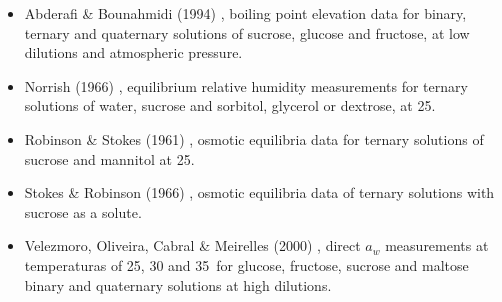 \documentclass[
	12pt,				%
	openright,
	twoside,
	a4paper,			%
	brazil,			%
	french,				%
	english				%
	]{abntex2}
\begin{document}
\begin{itemize}
		\begin{itemize}
			\item Abderafi \& Bounahmidi (1994) \cite{abderafi1994},
				boiling point elevation data for binary, ternary
				and quaternary solutions of sucrose, glucose and
				fructose, at low dilutions and atmospheric pressure.
			\item Norrish (1966) \cite{norrish1966}, equilibrium
				relative humidity measurements for ternary solutions
				of water, sucrose and sorbitol, glycerol or dextrose,
				at 25\textcelsius.
			\item Robinson \& Stokes (1961) \cite{stokes1961},
				osmotic equilibria data for ternary solutions
				of sucrose and mannitol at 25\textcelsius.
			\item Stokes \& Robinson (1966) \cite{stokes1966},
				osmotic equilibria data of ternary solutions with
				sucrose as a solute.
			\item Velezmoro, Oliveira, Cabral \& Meirelles (2000)
				\cite{velezmoro2000}, direct $a_w$ measurements
				at temperaturas of 25, 30 and 35\textcelsius\ for
				glucose, fructose, sucrose and maltose binary and
				quaternary solutions at high dilutions.
		\end{itemize}
\end{itemize}
\end{document}
